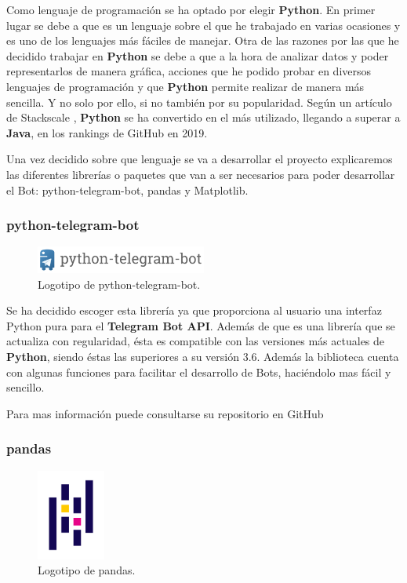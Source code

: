 Como lenguaje de programación se ha optado por elegir \textbf{Python}. En primer lugar se debe a que es un lenguaje sobre el que he trabajado en varias ocasiones y es uno de los lenguajes más fáciles de manejar. Otra de las razones por las que he decidido trabajar en \textbf{Python} se debe a que a la hora de analizar datos y poder representarlos de manera gráfica, acciones que he podido probar en diversos lenguajes de programación y que \textbf{Python} permite realizar de manera más sencilla. Y no solo por ello, si no también por su popularidad. Según un artículo de Stackscale \cite{articulo-stackscale}, \textbf{Python} se ha convertido en el más utilizado, llegando a superar a \textbf{Java}, en los rankings de GitHub en 2019.

Una vez decidido sobre que lenguaje se va a desarrollar el proyecto explicaremos las diferentes librerías o paquetes que van a ser necesarios para poder desarrollar el Bot: python-telegram-bot, pandas y Matplotlib.

\subsubsection{python-telegram-bot}

\begin{figure}[H]
	\centering
	\includegraphics[width=0.5\textwidth]{img/python-telegram-bot-icon}
	\caption{Logotipo de python-telegram-bot.}
\end{figure}

Se ha decidido escoger esta librería ya que proporciona al usuario una interfaz Python pura para el \textbf{Telegram Bot API}. Además de que es una librería que se actualiza con regularidad, ésta es compatible con las versiones más actuales de \textbf{Python}, siendo éstas las superiores a su versión 3.6. Además la biblioteca cuenta con algunas funciones para facilitar el desarrollo de Bots, haciéndolo mas fácil y sencillo.

Para mas información puede consultarse su repositorio en GitHub \cite{python-telegram-bot}

\subsubsection{pandas}

\begin{figure}[H]
	\centering
	\includegraphics[width=0.2\textwidth]{img/pandas-icon}
	\caption{Logotipo de pandas.}
\end{figure}

